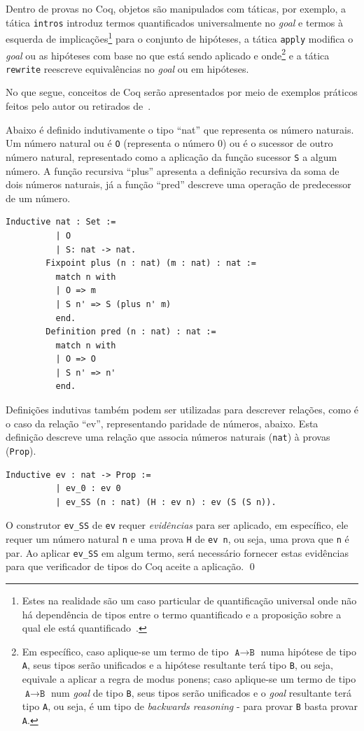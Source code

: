 		Dentro de provas no Coq, objetos são manipulados com táticas, por exemplo, a tática \texttt{intros} introduz termos quantificados universalmente
		no \textit{goal} e termos à esquerda de implicações\footnote{Estes na realidade são um caso particular de quantificação universal onde não há
		dependência de tipos entre o termo quantificado e a proposição sobre a qual ele está quantificado~\cite{pierce2021software}.} para o conjunto de hipóteses,
		a tática \texttt{apply} modifica o \textit{goal} ou as hipóteses com base no que está sendo aplicado e onde\footnote{Em específico, caso aplique-se um termo de tipo
		\(\texttt{A} \to \texttt{B}\) numa hipótese de tipo \texttt{A}, seus tipos serão unificados e a hipótese resultante terá tipo \texttt{B}, ou seja, equivale a aplicar
		a regra de modus ponens; caso aplique-se um termo de tipo \(\texttt{A} \to \texttt{B}\) num \textit{goal} de tipo \texttt{B}, seus tipos serão unificados e o
		\textit{goal} resultante terá tipo \texttt{A}, ou seja, é um tipo de \textit{backwards reasoning} - para provar \texttt{B} basta provar \texttt{A}.}
		e a tática \texttt{rewrite} reescreve equivalências no \textit{goal} ou em hipóteses.

		No que segue, conceitos de Coq serão apresentados por meio de exemplos práticos feitos pelo autor ou retirados de~.

		\begin{exemplo}
			Abaixo é definido indutivamente o tipo ``nat'' que representa os número naturais. Um número natural ou é \texttt{O} (representa o número 0) ou é o
			sucessor de outro número natural, representado como a aplicação da função sucessor \texttt{S} a algum número.
			A função recursiva ``plus'' apresenta a definição recursiva da soma de dois números naturais, já a função ``pred'' descreve uma operação de predecessor de um número.
			\begin{lstlisting}[language=coq]
		Inductive nat : Set :=
		  | O
		  | S: nat -> nat.
		Fixpoint plus (n : nat) (m : nat) : nat :=
		  match n with
		  | O => m
		  | S n' => S (plus n' m)
		  end.
		Definition pred (n : nat) : nat :=
		  match n with
		  | O => O
		  | S n' => n'
		  end.
			\end{lstlisting}
			Definições indutivas também podem ser utilizadas para descrever relações, como é o caso da relação ``ev'', representando paridade de números, abaixo.
			Esta definição descreve uma relação que associa números naturais (\texttt{nat}) à provas (\texttt{Prop}).
			\begin{lstlisting}[language=coq]
		Inductive ev : nat -> Prop :=
		  | ev_0 : ev 0
		  | ev_SS (n : nat) (H : ev n) : ev (S (S n)).
			\end{lstlisting}

			O construtor \texttt{ev\_SS} de \texttt{ev} requer \textit{evidências} para ser aplicado, em específico, ele requer um número natural \texttt{n} e uma prova
			\texttt{H} de \texttt{ev n}, ou seja, uma prova que \texttt{n} é par. Ao aplicar \texttt{ev\_SS} em algum termo, será necessário fornecer estas evidências
			para que verificador de tipos do Coq aceite a aplicação. \qed
		\end{exemplo}

